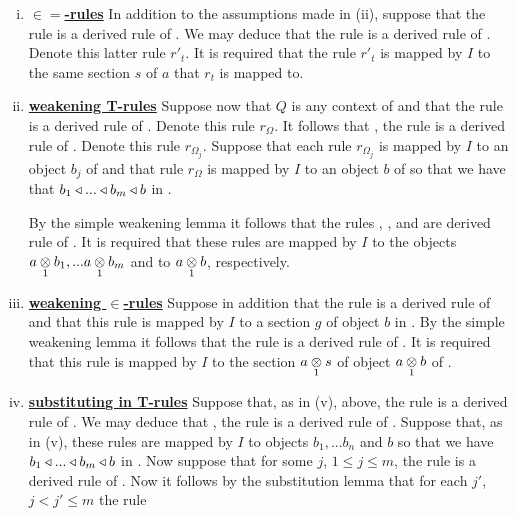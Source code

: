 \begin{enumerate}[(i)]
\item \underline{\textbf{$\boldsymbol{\in=}$-rules}} 
In addition to the assumptions made in (ii),  suppose that the rule
is a derived rule of \gatU. We may deduce that the rule
 is a  derived rule of \gatU. 
Denote this latter rule $r'_t$.
It is required that the rule $r'_t$ is mapped by $I$ to the same section $s$ of $a$ that $r_t$ is mapped to.

\item \underline{\textbf{weakening T-rules}} 
Suppose now that $Q$ is any context of \gatUw and that the rule 
 is a derived rule of \gatU. Denote this rule $r_\Omega$. 
It follows that \foreachj, the rule    is a derived rule of \gatU. Denote this rule $r_{\Omega_j}$.
Suppose that each rule $r_{\Omega_j}$ is mapped by $I$ to an object $b_j$ of \catcw and that rule $r_\Omega$ is mapped by $I$ to an object $b$ of \catcw so that
we have that $b_1 \base ... \base b_m \base b$ in \catc.

By the simple weakening lemma it follows that the rules
, \foreachj, and 
 are  derived rule of \gatU. It is required that these rules are mapped by $I$ to the objects
$\crossx{a}{b_1}{1},...\crossx{a}{b_m}{1}$ and to $\crossx{a}{b}{1}$, respectively. 

\item \underline{\textbf{weakening $\boldsymbol {\in}$-rules}} 
Suppose in addition that the rule  is a derived rule of \gatUw 
and that this rule is mapped by $I$ to a section $g$ of object $b$ in \catc.
By the simple weakening lemma it follows that the rule 
is a derived rule of \gatU. It is required that this rule is mapped by $I$ to the section $\crossx{a}{s}{1}$
of object $\crossx{a}{b}{1}$ of \catc.


\item \underline{\textbf{substituting in T-rules}} 
Suppose that, as in (v), above, the rule 
 is a derived rule of \gatU.
We may deduce that \foreachj, the rule    is a derived rule of \gatU. 
Suppose that, as in (v), these rules are mapped by $I$ to objects $b_1,...b_n$ and $b$ so that
we have  $b_1 \base ... \base b_m \base b$ in \catc. Now suppose that for some $j$, $1 \leq j \leq m$, the rule
 is a derived rule of \gatU. 
Now it follows by the substitution lemma that for each $j'$, $j < j' \leq m$ the rule


\end{enumerate}
